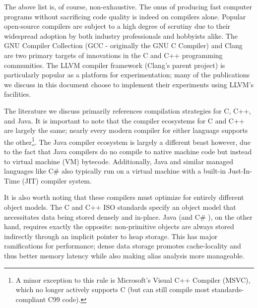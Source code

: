 \documentclass[nobib]{tufte-handout}
\newcommand{\csharp}{C\# }
\begin{document}
The above list is, of course, non-exhaustive.  The onus of producing fast computer programs without sacrificing code quality is indeed on compilers alone.  Popular open-source compilers are subject to a high degree of scrutiny due to their widespread adoption by both industry professionals and hobbyists alike.  The GNU Compiler Collection (GCC - originally the GNU C Compiler) and Clang are two primary targets of innovations in the C and C++ programming communities.  The LLVM compiler framework (Clang's parent project) is particularly popular as a platform for experimentation; many of the publications we discuss in this document choose to implement their experiments using LLVM's facilities.

The literature we discuss primarily references compilation strategies for C, C++, and Java.  It is important to note that the compiler ecosystems for C and C++ are largely the same; nearly every modern compiler for either language supports the other\footnote{A minor exception to this rule is Microsoft's Visual C++ Compiler (MSVC), which no longer actively supports C (but can still compile most standards-compliant C99 code).}.  The Java compiler ecosystem is largely a different beast however, due to the fact that Java compilers do no compile to native machine code but instead to virtual machine (VM) bytecode.  Additionally, Java and similar managed languages like \csharp also typically run on a virtual machine with a built-in Just-In-Time (JIT) compiler system.  

It is also worth noting that these compilers must optimize for entirely different object models.  The C and C++ ISO standards specify an object model that necessitates data being stored densely and in-place.  Java (and \csharp), on the other hand, requires exactly the opposite: non-primitive objects are always stored indirectly through an implicit pointer to heap storage.  This has major ramifications for performance; dense data storage promotes cache-locality and thus better memory latency while also making alias analysis more manageable.
\end{document}
